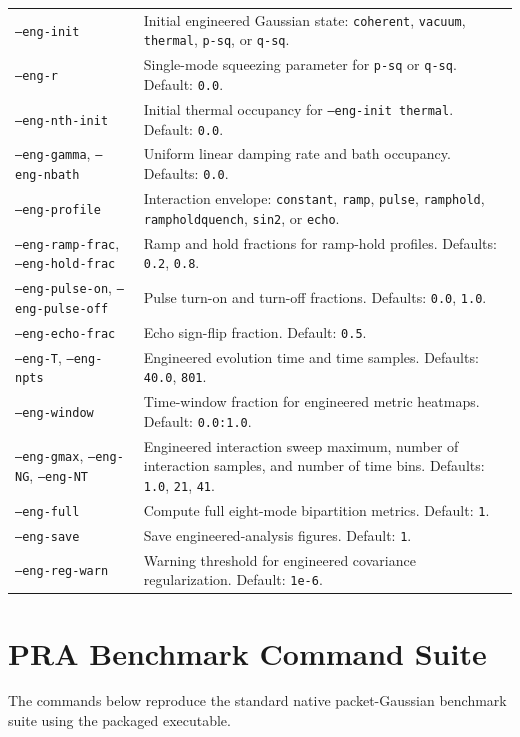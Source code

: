 \documentclass[11pt]{article}
\begin{document}
\begin{longtable}{L{0.31\textwidth}L{0.61\textwidth}}
\texttt{--eng-init} & Initial engineered Gaussian state: \texttt{coherent}, \texttt{vacuum}, \texttt{thermal}, \texttt{p-sq}, or \texttt{q-sq}. \\
\texttt{--eng-r} & Single-mode squeezing parameter for \texttt{p-sq} or \texttt{q-sq}. Default: \texttt{0.0}. \\
\texttt{--eng-nth-init} & Initial thermal occupancy for \texttt{--eng-init thermal}. Default: \texttt{0.0}. \\
\texttt{--eng-gamma}, \texttt{--eng-nbath} & Uniform linear damping rate and bath occupancy. Defaults: \texttt{0.0}. \\
\texttt{--eng-profile} & Interaction envelope: \texttt{constant}, \texttt{ramp}, \texttt{pulse}, \texttt{ramphold}, \texttt{rampholdquench}, \texttt{sin2}, or \texttt{echo}. \\
\texttt{--eng-ramp-frac}, \texttt{--eng-hold-frac} & Ramp and hold fractions for ramp-hold profiles. Defaults: \texttt{0.2}, \texttt{0.8}. \\
\texttt{--eng-pulse-on}, \texttt{--eng-pulse-off} & Pulse turn-on and turn-off fractions. Defaults: \texttt{0.0}, \texttt{1.0}. \\
\texttt{--eng-echo-frac} & Echo sign-flip fraction. Default: \texttt{0.5}. \\
\texttt{--eng-T}, \texttt{--eng-npts} & Engineered evolution time and time samples. Defaults: \texttt{40.0}, \texttt{801}. \\
\texttt{--eng-window} & Time-window fraction for engineered metric heatmaps. Default: \texttt{0.0:1.0}. \\
\texttt{--eng-gmax}, \texttt{--eng-NG}, \texttt{--eng-NT} & Engineered interaction sweep maximum, number of interaction samples, and number of time bins. Defaults: \texttt{1.0}, \texttt{21}, \texttt{41}. \\
\texttt{--eng-full} & Compute full eight-mode bipartition metrics. Default: \texttt{1}. \\
\texttt{--eng-save} & Save engineered-analysis figures. Default: \texttt{1}. \\
\texttt{--eng-reg-warn} & Warning threshold for engineered covariance regularization. Default: \texttt{1e-6}. \\
\bottomrule
\end{longtable}

\section{PRA Benchmark Command Suite}
\label{sec:pra-suite}
The commands below reproduce the standard native packet-Gaussian benchmark
suite using the packaged executable.
\end{document}

